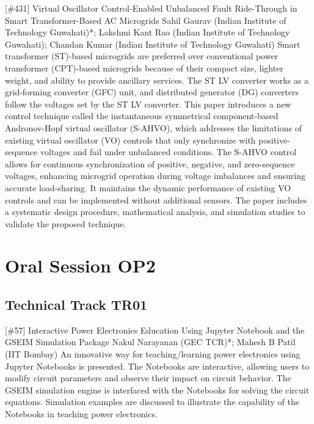 {} \begin{abstract_online} {[\#431] Virtual Oscillator Control-Enabled Unbalanced Fault Ride-Through in Smart Transformer-Based AC Microgrids} {} {Sahil Gaurav (Indian Institute of Technology Guwahati)*; Lakshmi Kant Rao (Indian Institute of Technology Guwahati); Chandan Kumar (Indian Institute of Technology Guwahati)} {} Smart transformer (ST)-based microgrids are preferred over conventional power transformer (CPT)-based microgrids because of their compact size, lighter weight, and ability to provide ancillary services. The ST LV converter works as a grid-forming converter (GFC) unit, and distributed generator (DG) converters follow the voltages set by the ST LV converter. This paper introduces a new control technique called the instantaneous symmetrical component-based Andronov-Hopf virtual oscillator (S-AHVO), which addresses the limitations of existing virtual oscillator (VO) controls that only synchronize with positive-sequence voltages and fail under unbalanced conditions. The S-AHVO control allows for continuous synchronization of positive, negative, and zero-sequence voltages, enhancing microgrid operation during voltage imbalances and ensuring accurate load-sharing. It maintains the dynamic performance of existing VO controls and can be implemented without additional sensors. The paper includes a systematic design procedure, mathematical analysis, and simulation studies to validate the proposed technique. \end{abstract_online} 
\clearpage\section{Oral Session OP2}\nopagebreak \subsection{Technical Track TR01}\nopagebreak{} \begin{abstract_online} {[\#57] Interactive Power Electronics Education Using Jupyter Notebook and the GSEIM Simulation Package} {} {Nakul Narayanan (GEC TCR)*; Mahesh B Patil (IIT Bombay)} {} An innovative way for teaching/learning power electronics using Jupyter Notebooks is presented. The Notebooks are interactive, allowing users to modify circuit parameters and observe their impact on circuit behavior. The GSEIM simulation engine is interfaced with the Notebooks for solving the circuit equations. Simulation examples are discussed to illustrate the capability of the Notebooks in teaching power electronics.  \end{abstract_online} 
